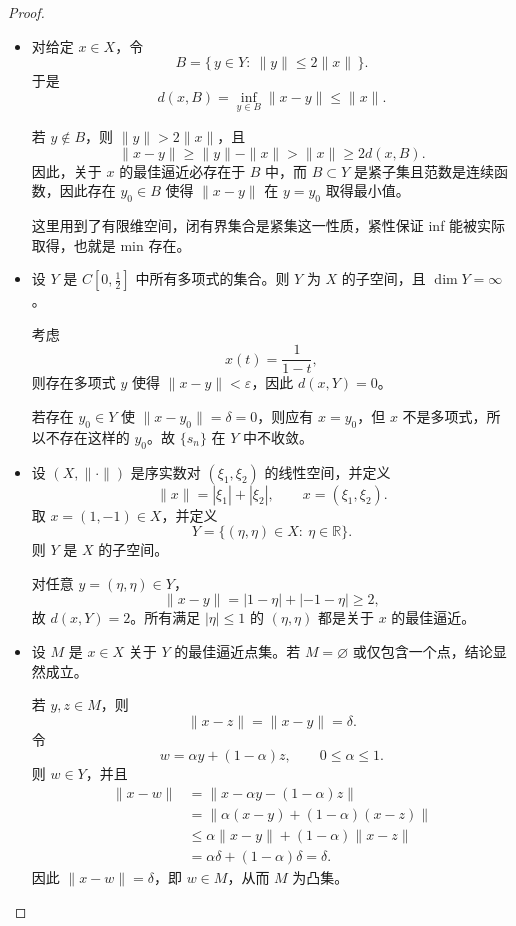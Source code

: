 \begin{proof}
\begin{itemize}

\item[(1)]  
对给定 $x\in X$，令  
\[
B=\{\,y\in Y:\ \|y\|\le 2\|x\|\,\}.
\]
于是
\[
d(x,B)=\inf_{y\in B}\|x-y\|\le \|x\|.
\]

若 $y\notin B$，则 $\|y\|>2\|x\|$，且
\[
\|x-y\|\ge \|y\|-\|x\|>\|x\|\ge 2d(x,B).
\]
因此，关于 $x$ 的最佳逼近必存在于 $B$ 中，而 $B\subset Y$ 是紧子集且范数是连续函数，因此存在 $y_0\in B$ 使得 $\|x-y\|$ 在 $y=y_0$ 取得最小值。
\begin{dxtips}
这里用到了有限维空间，闭有界集合是紧集这一性质，紧性保证 inf 能被实际取得，也就是 min 存在。
\end{dxtips}
\item[(2)]
设 $Y$ 是 $C\!\left[0,\tfrac12\right]$ 中所有多项式的集合。则 $Y$ 为 $X$ 的子空间，且 $\dim Y=\infty$。

考虑
\[
x(t)=\frac{1}{1-t},
\]
则存在多项式 $y$ 使得 $\|x-y\|<\varepsilon$，因此 $d(x,Y)=0$。

若存在 $y_0\in Y$ 使 $\|x-y_0\|=\delta=0$，则应有 $x=y_0$，但 $x$ 不是多项式，所以不存在这样的 $y_0$。故 $\{s_n\}$ 在 $Y$ 中不收敛。

\item[(3)]
设 $(X,\|\cdot\|)$ 是序实数对 $(\xi_1,\xi_2)$ 的线性空间，并定义
\[
\|x\|=|\xi_1|+|\xi_2|,\qquad x=(\xi_1,\xi_2).
\]
取 $x=(1,-1)\in X$，并定义
\[
Y=\{(\eta,\eta)\in X:\ \eta\in\mathbb R\}.
\]
则 $Y$ 是 $X$ 的子空间。

对任意 $y=(\eta,\eta)\in Y$，
\[
\|x-y\|=|1-\eta|+|-1-\eta|\ge 2,
\]
故 $d(x,Y)=2$。所有满足 $|\eta|\le 1$ 的 $(\eta,\eta)$ 都是关于 $x$ 的最佳逼近。

\item[(4)]
设 $M$ 是 $x\in X$ 关于 $Y$ 的最佳逼近点集。若 $M=\varnothing$ 或仅包含一个点，结论显然成立。

若 $y,z\in M$，则
\[
\|x-z\|=\|x-y\|=\delta.
\]
令
\[
w=\alpha y+(1-\alpha)z,\qquad 0\le \alpha\le 1.
\]
则 $w\in Y$，并且
\[
\begin{aligned}
\|x-w\|
&=\|x-\alpha y-(1-\alpha)z\|\\
&=\|\alpha(x-y)+(1-\alpha)(x-z)\|\\
&\le \alpha\|x-y\|+(1-\alpha)\|x-z\|\\
&=\alpha\delta+(1-\alpha)\delta=\delta.
\end{aligned}
\]
因此 $\|x-w\|=\delta$，即 $w\in M$，从而 $M$ 为凸集。

\end{itemize}
\end{proof}
